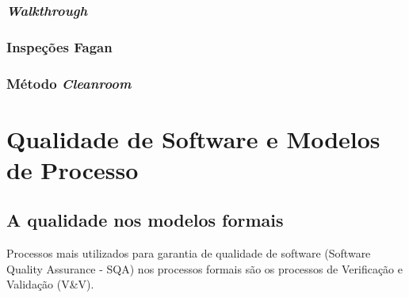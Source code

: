 \documentclass[
	12pt,				%
	openright,			%
	oneside,			%
	a4paper,			%
	english,			%
	brazil,				%
	]{abntex2}
\begin{document}
\subsection{\emph{Walkthrough}}


\subsection{Inspeções Fagan}


\subsection{Método \emph{Cleanroom}}




\chapter{Qualidade de Software e Modelos de Processo}

\section{A qualidade nos modelos formais}


Processos mais utilizados para garantia de qualidade de software (Software Quality Assurance - SQA) nos processos formais são os processos de Verificação e Validação (V\&V).
\end{document}
